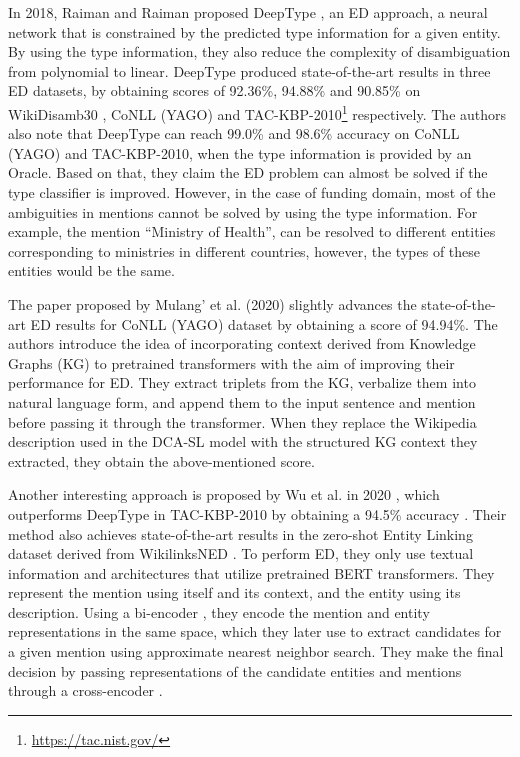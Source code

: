 \documentclass{report}
\theoremstyle{definition}
\theoremstyle{remark}
\begin{document}
In 2018, Raiman and Raiman proposed DeepType \cite{raiman}, an ED approach, a neural network that is constrained by the predicted type information for a given entity. By using the type information, they also reduce the complexity of disambiguation from polynomial to linear. DeepType produced state-of-the-art results in three ED datasets, by obtaining scores of 92.36\%, 94.88\% and 90.85\% on WikiDisamb30 \cite{wikidisamb}, CoNLL (YAGO) \cite{CoNLLYago} and TAC-KBP-2010\footnote{\url{https://tac.nist.gov/}} respectively. The authors also note that DeepType can reach 99.0\% and 98.6\% accuracy on CoNLL (YAGO) and TAC-KBP-2010, when the type information is provided by an Oracle. Based on that, they claim the ED problem can almost be solved if the type classifier is improved. However, in the case of funding domain, most of the ambiguities in mentions cannot be solved by using the type information. For example, the mention ``Ministry of Health'', can be resolved to different entities corresponding to ministries in different countries, however,  the types of these entities would be the same.

The paper proposed by Mulang' et al. (2020) \cite{mulang} slightly advances the state-of-the-art ED results for CoNLL (YAGO) \cite{CoNLLYago} dataset by obtaining a score of 94.94\%. The authors introduce the idea of incorporating context derived from Knowledge Graphs (KG) to pretrained transformers with the aim of improving their performance for ED. They extract triplets from the KG, verbalize them into natural language form, and append them to the input sentence and mention before passing it through the transformer. When they replace the Wikipedia description used in the DCA-SL model \cite{dca} with the structured KG context they extracted, they obtain the above-mentioned score. 

Another interesting approach is proposed by Wu et al. in 2020 \cite{scalablezeroshot}, which outperforms DeepType \cite{raiman} in TAC-KBP-2010 by obtaining a 94.5\% accuracy . Their method also achieves state-of-the-art results in the zero-shot Entity Linking dataset derived from WikilinksNED \cite{wikilinksned}. To perform ED, they only use textual information and architectures that utilize pretrained BERT \cite{BERT} transformers. They represent the mention using itself and its context, and the entity using its description. Using a bi-encoder \cite{polyencoders}, they encode the mention and entity representations in the same space, which they later use to extract candidates for a given mention using approximate nearest neighbor search. They make the final decision by passing representations of the candidate entities and mentions through a cross-encoder \cite{polyencoders}. 
\end{document}
